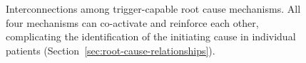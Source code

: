 \begin{figure}[htbp]
\caption{Interconnections among trigger-capable root cause mechanisms.
All four mechanisms can co-activate and reinforce each other, complicating
the identification of the initiating cause in individual patients
(Section~\ref{sec:root-cause-relationships}).}
\label{fig:trigger-relationships}
\end{figure}
